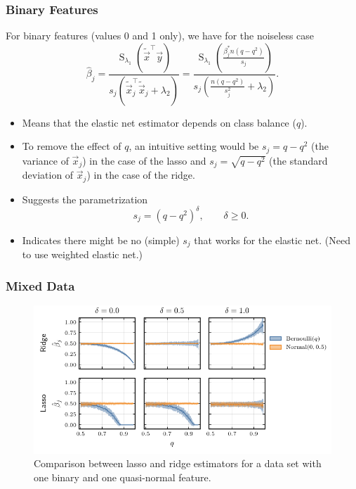 \documentclass[10pt]{beamer}
\begin{document}
\begin{frame}[c]
  \frametitle{Binary Features}

  For binary features (values 0 and 1 only), we have for the noiseless case
  \[
    \hat{\beta}_j = \frac{\operatorname{S}_{\lambda_1}(\tilde{\vec{x}}^\intercal \vec{y})}{s_j\left(\tilde{\vec{x}}_j^\intercal \tilde{\vec{x}}_j + \lambda_2\right)}
    =
    \frac{\operatorname{S}_{\lambda_1}\left(\frac{\beta_j^* n (q - q^2)}{s_j}\right)}{s_j\left(\frac{n(q - q^2)}{s_j^2} + \lambda_2\right)}.
  \]
  \pause
  \begin{itemize}[<+->]
    \item Means that the elastic net estimator depends on class balance (\(q\)).
    \item To remove the effect of \(q\), an intuitive setting would be \(s_j = q - q^2\) (the
          variance of \(\vec{x}_j\)) in the case of the lasso and \(s_j = \sqrt{q-q^2}\) (the
          standard deviation of \(\vec{x}_j\)) in the case of the ridge.
    \item Suggests the parametrization
          \[
            s_j = (q - q^2)^\delta, \qquad \delta \geq 0.
          \]
    \item Indicates there might be no (simple) \(s_j\) that works for the elastic net. (Need to use
          weighted elastic net.)
  \end{itemize}
\end{frame}

\begin{frame}[c]
  \frametitle{Mixed Data}

  \begin{figure}[htpb]
    \centering
    \includegraphics[width=\textwidth]{figures/paper6-mixed_data.pdf}
    \caption{%
      Comparison between lasso and ridge estimators for a data set with one binary and one quasi-normal feature.}
  \end{figure}
\end{frame}
\end{document}
